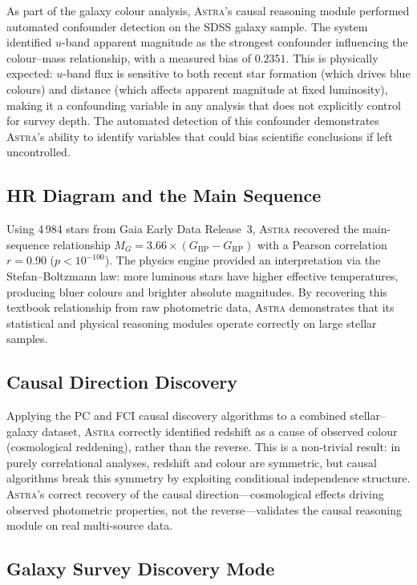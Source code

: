 \documentclass[usenatbib]{rasti}
\newcommand{\astra}{\textsc{Astra}\xspace}
\newcommand{\pc}{PC\xspace}
\newcommand{\fci}{FCI\xspace}
\begin{document}
As part of the galaxy colour analysis, \astra's causal reasoning module performed automated confounder detection on the SDSS galaxy sample.
The system identified $u$-band apparent magnitude as the strongest confounder influencing the colour--mass relationship, with a measured bias of $0.2351$.
This is physically expected: $u$-band flux is sensitive to both recent star formation (which drives blue colours) and distance (which affects apparent magnitude at fixed luminosity), making it a confounding variable in any analysis that does not explicitly control for survey depth.
The automated detection of this confounder demonstrates \astra's ability to identify variables that could bias scientific conclusions if left uncontrolled.

\subsection{HR Diagram and the Main Sequence}
\label{sec:live:hr}

Using 4\,984 stars from Gaia Early Data Release~3, \astra recovered the main-sequence relationship $M_{G} = 3.66 \times (G_{\mathrm{BP}} - G_{\mathrm{RP}})$ with a Pearson correlation $r = 0.90$ ($p < 10^{-100}$).
The physics engine provided an interpretation via the Stefan--Boltzmann law: more luminous stars have higher effective temperatures, producing bluer colours and brighter absolute magnitudes.
By recovering this textbook relationship from raw photometric data, \astra demonstrates that its statistical and physical reasoning modules operate correctly on large stellar samples.

\subsection{Causal Direction Discovery}
\label{sec:live:causal}

Applying the \pc and \fci \citep{Zhang2008} causal discovery algorithms to a combined stellar--galaxy dataset, \astra correctly identified redshift as a cause of observed colour (cosmological reddening), rather than the reverse.
This is a non-trivial result: in purely correlational analyses, redshift and colour are symmetric, but causal algorithms break this symmetry by exploiting conditional independence structure.
\astra's correct recovery of the causal direction---cosmological effects driving observed photometric properties, not the reverse---validates the causal reasoning module on real multi-source data.

\subsection{Galaxy Survey Discovery Mode}
\label{sec:live:galaxy}
\end{document}
